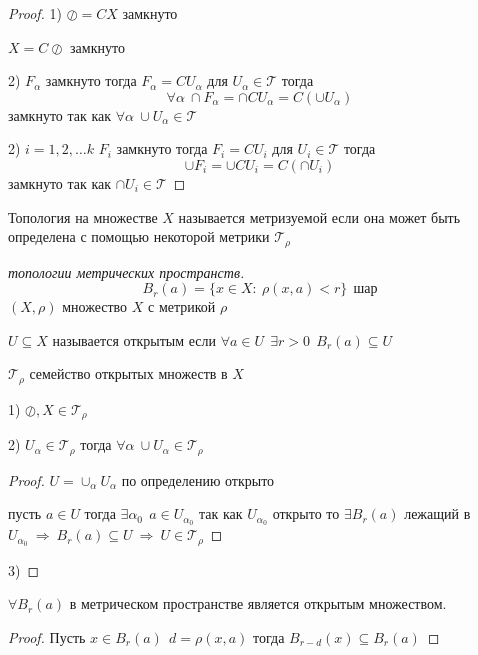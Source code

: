 \begin{proof}
  1) $\oslash = CX$ замкнуто

  $X = C \oslash$ замкнуто

  2) $F_{\alpha}$ замкнуто тогда $F_{\alpha} = CU_{\alpha}$ для
  $U_{\alpha} \in \mathcal{T}$ тогда
  $$
  \forall \alpha ~ \cap F_{\alpha} = \cap CU_{\alpha} = C(\cup U_{\alpha})
  $$
  замкнуто так как $\forall \alpha ~ \cup U_{\alpha} \in \mathcal{T}$

  2) $i = 1,2, \ldots k$ $F_i$ замкнуто тогда $F_i = CU_i$ для $U_i \in
  \mathcal{T}$ тогда
  $$
  \cup F_i = \cup CU_i = C(\cap U_i)
  $$
  замкнуто так как $\cap U_i \in \mathcal{T}$
\end{proof}

\begin{define}
  Топология на множестве $X$ называется метризуемой если она может быть
  определена с помощью некоторой метрики $\mathcal{T_{\rho}}$
\end{define}

\begin{proof}[топологии метрических пространств]
  $$
  B_r(a) = \{x \in X : ~ \rho(x,a) < r\} ~~ \text{шар}
  $$
  $(X,\rho)$ множество $X$ с метрикой $\rho$

  $U \subseteq X$ называется открытым если $\forall a \in U ~~ \exists r > 0 ~~
  B_r(a) \subseteq U$

  $\mathcal{T}_{\rho}$ семейство открытых множеств в $X$

  1) $\oslash, X \in \mathcal{T}_{\rho}$

  2) $U_{\alpha} \in \mathcal{T}_{\rho}$ тогда $\forall \alpha ~ \cup U_{\alpha}
   \in \mathcal{T}_{\rho}$

  \begin{proof}
    $U = \cup_{\alpha} U_{\alpha}$ по определению открыто

    пусть $a \in U$ тогда $\exists \alpha_0 ~~
    a \in U_{\alpha_0}$ так как $U_{\alpha_0}$ открыто то $\exists B_r(a)$
    лежащий в $U_{\alpha_0} ~ \Rightarrow ~ B_r (a) \subseteq U ~ \Rightarrow ~
    U \in \mathcal{T}_{\rho}$
  \end{proof}
  3)
\end{proof}

\begin{theorem}
  $\forall B_r(a)$ в метрическом пространстве является открытым множеством.
\end{theorem}

\begin{proof}
  Пусть $x \in B_r(a) ~~ d = \rho(x, a)$ тогда $B_{r-d}(x) \subseteq B_r(a)$
\end{proof}


